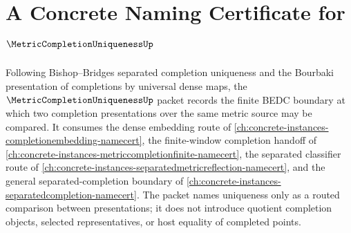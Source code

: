 \chapter{A Concrete Naming Certificate for $\MetricCompletionUniquenessUp$}
\label{ch:concrete-instances-metric-completion-uniqueness-namecert}

Following Bishop--Bridges separated completion uniqueness and the Bourbaki presentation of completions by universal dense maps, the $\MetricCompletionUniquenessUp$ packet records the finite BEDC boundary at which two completion presentations over the same metric source may be compared. It consumes the dense embedding route of \autoref{ch:concrete-instances-completionembedding-namecert}, the finite-window completion handoff of \autoref{ch:concrete-instances-metriccompletionfinite-namecert}, the separated classifier route of \autoref{ch:concrete-instances-separatedmetricreflection-namecert}, and the general separated-completion boundary of \autoref{ch:concrete-instances-separatedcompletion-namecert}. The packet names uniqueness only as a routed comparison between presentations; it does not introduce quotient completion objects, selected representatives, or host equality of completed points.

